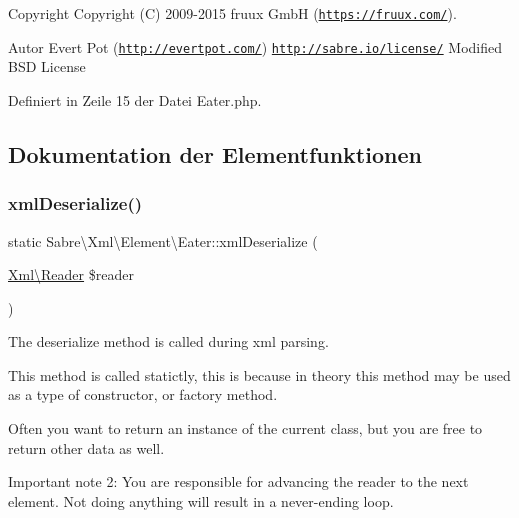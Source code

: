 \begin{DoxyCopyright}{Copyright}
Copyright (C) 2009-\/2015 fruux GmbH (\href{https://fruux.com/}{\tt https\+://fruux.\+com/}). 
\end{DoxyCopyright}
\begin{DoxyAuthor}{Autor}
Evert Pot (\href{http://evertpot.com/}{\tt http\+://evertpot.\+com/})  \href{http://sabre.io/license/}{\tt http\+://sabre.\+io/license/} Modified B\+SD License 
\end{DoxyAuthor}


Definiert in Zeile 15 der Datei Eater.\+php.



\subsection{Dokumentation der Elementfunktionen}
\mbox{\label{class_sabre_1_1_xml_1_1_element_1_1_eater_af251bc4f008ecef8fcbacb6996e594b9}} 
\subsubsection{\texorpdfstring{xml\+Deserialize()}{xmlDeserialize()}}
{\footnotesize\ttfamily static Sabre\textbackslash{}\+Xml\textbackslash{}\+Element\textbackslash{}\+Eater\+::xml\+Deserialize (\begin{DoxyParamCaption}\item[{\mbox{\hyperlink{class_sabre_1_1_xml_1_1_reader}{Xml\textbackslash{}\+Reader}}}]{\$reader }\end{DoxyParamCaption})\hspace{0.3cm}{\ttfamily [static]}}

The deserialize method is called during xml parsing.

This method is called statictly, this is because in theory this method may be used as a type of constructor, or factory method.

Often you want to return an instance of the current class, but you are free to return other data as well.

Important note 2\+: You are responsible for advancing the reader to the next element. Not doing anything will result in a never-\/ending loop.

